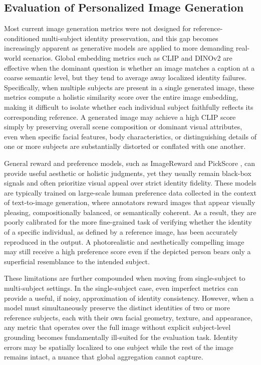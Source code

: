 \documentclass{article}
\begin{document}
\subsection{Evaluation of Personalized Image Generation}
Most current image generation metrics were not designed for reference-conditioned multi-subject identity preservation, and this gap becomes increasingly apparent as generative models are applied to more demanding real-world scenarios. Global embedding metrics such as CLIP \cite{radford2021learning} and DINOv2 \cite{oquab2023dinov2} are effective when the dominant question is whether an image matches a caption at a coarse semantic level, but they tend to average away localized identity failures. Specifically, when multiple subjects are present in a single generated image, these metrics compute a holistic similarity score over the entire image embedding, making it difficult to isolate whether each individual subject faithfully reflects its corresponding reference. A generated image may achieve a high CLIP score simply by preserving overall scene composition or dominant visual attributes, even when specific facial features, body characteristics, or distinguishing details of one or more subjects are substantially distorted or conflated with one another.

General reward and preference models, such as ImageReward \cite{xu2023imagereward} and PickScore \cite{kirstain2023pick}, can provide useful aesthetic or holistic judgments, yet they usually remain black-box signals and often prioritize visual appeal over strict identity fidelity. These models are typically trained on large-scale human preference data collected in the context of text-to-image generation, where annotators reward images that appear visually pleasing, compositionally balanced, or semantically coherent. As a result, they are poorly calibrated for the more fine-grained task of verifying whether the identity of a specific individual, as defined by a reference image, has been accurately reproduced in the output. A photorealistic and aesthetically compelling image may still receive a high preference score even if the depicted person bears only a superficial resemblance to the intended subject.

These limitations are further compounded when moving from single-subject to multi-subject settings. In the single-subject case, even imperfect metrics can provide a useful, if noisy, approximation of identity consistency. However, when a model must simultaneously preserve the distinct identities of two or more reference subjects, each with their own facial geometry, texture, and appearance, any metric that operates over the full image without explicit subject-level grounding becomes fundamentally ill-suited for the evaluation task. Identity errors may be spatially localized to one subject while the rest of the image remains intact, a nuance that global aggregation cannot capture.
\end{document}

